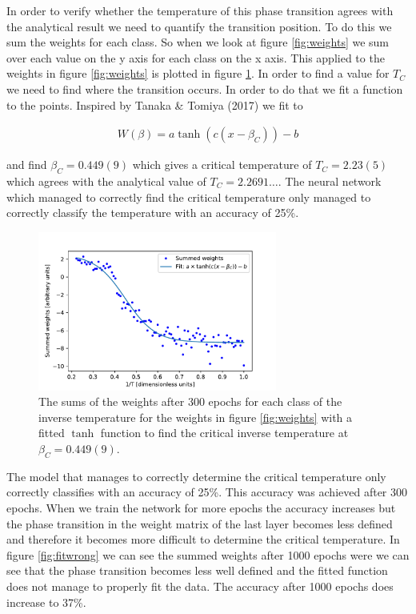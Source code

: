 \documentclass[10 pt, a4paper]{article}
\begin{document}
In order to verify whether the temperature of this phase transition agrees with the analytical result we need to quantify the transition position. To do this we sum the weights for each class. So when we look at figure \ref{fig:weights} we sum over each value on the y axis for each class on the x axis. This applied to the weights in figure \ref{fig:weights} is plotted in figure \ref{fig:fit}. In order to find a value for $T_C$ we need to find where the transition occurs. In order to do that we fit a function to the points. Inspired by Tanaka \& Tomiya (2017) \cite{phasemethod} we fit to

\begin{align*}
W(\beta) = a \tanh(c(x - \beta_C)) - b
\end{align*}

and find $\beta_C = 0.449(9)$ which gives a critical temperature of $T_C = 2.23(5)$ which agrees with the analytical value of $T_C = 2.2691 \dots$. The neural network which managed to correctly find the critical temperature only managed to correctly classify the temperature with an accuracy of 25\%.

\begin{figure}[H] 
\centering
\includegraphics[width=0.7\textwidth]{fit}
\caption{The sums of the weights after 300 epochs for each class of the inverse temperature for the weights in figure \ref{fig:weights} with a fitted $\tanh$ function to find the critical inverse temperature at $\beta_C = 0.449(9)$. \label{fig:fit}}
\end{figure}

The model that manages to correctly determine the critical temperature only correctly classifies with an accuracy of 25\%. This accuracy was achieved after 300 epochs. When we train the network for more epochs the accuracy increases but the phase transition in the weight matrix of the last layer becomes less defined and therefore it becomes more difficult to determine the critical temperature. In figure \ref{fig:fitwrong} we can see the summed weights after 1000 epochs were we can see that the phase transition becomes less well defined and the fitted function does not manage to properly fit the data. The accuracy after 1000 epochs does increase to 37\%.
\end{document}
